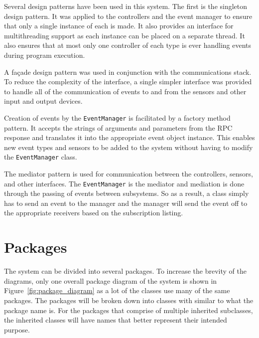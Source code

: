 \documentclass{report}
\begin{document}

Several design patterns have been used in this system. The first is the
singleton design pattern. It was applied to the controllers and the event
manager to ensure that only a single instance of each is made. It also provides
an interface for multithreading support as each instance can be placed on a
separate thread. It also ensures that at most only one controller of each type
is ever handling events during program execution.

A fa\c{c}ade design pattern was used in conjunction with the communications
stack. To reduce the complexity of the interface, a single simpler interface
was provided to handle all of the communication of events to and from the
sensors and other input and output devices.

Creation of events by the \texttt{EventManager} is facilitated by a factory
method pattern. It accepts the strings of arguments and parameters from the RPC
response and translates it into the appropriate event object instance. This
enables new event types and sensors to be added to the system without having to
modify the \texttt{EventManager} class.

The mediator pattern is used for communication between the controllers,
sensors, and other interfaces. The \texttt{EventManager} is the mediator and
mediation is done through the passing of events between subsystems. So as a
result, a class simply has to send an event to the manager and the manager will
send the event off to the appropriate receivers based on the subscription
listing.


\section{Packages}
The system can be divided into several packages. To increase the brevity of the
diagrams, only one overall package diagram of the system is shown in
Figure~\ref{fig:package_diagram} as a lot of the classes use many of the same
packages. The packages will be broken down into classes with similar to what
the package name is. For the packages that comprise of multiple inherited
subclasses, the inherited classes will have names that better represent their
intended purpose.
\end{document}
